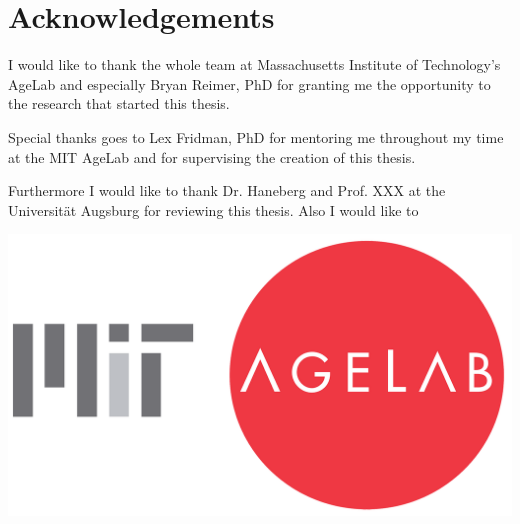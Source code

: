 \chapter*{Acknowledgements}
\label{acknowledgements}


I would like to thank the whole team at Massachusetts Institute of Technology's AgeLab and especially Bryan Reimer, PhD for granting me the opportunity to the research that started this thesis.

Special thanks goes to Lex Fridman, PhD for mentoring me throughout my time at the MIT AgeLab and for supervising the creation of this thesis. %


Furthermore I would like to thank Dr. Haneberg and Prof. XXX at the Universität Augsburg for reviewing this thesis. Also I would like to 


\vspace{2.5cm}
\begin{center}
	\includegraphics[width=.8\textwidth]{./images/logos/agelab}
\end{center}
